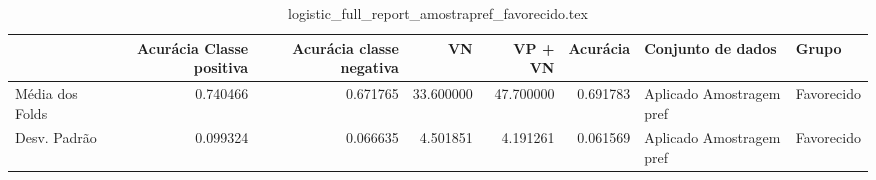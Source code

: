 \begin{table}
\centering
\caption{logistic_full_report_amostrapref_favorecido.tex}
\label{logistic_full_report_amostrapref_favorecido.tex}
\begin{tabular}{lrrrrrll}
\toprule
{} &  Acurácia Classe positiva &  Acurácia classe negativa &        VN  &   VP + VN  &  Acurácia &         Conjunto de dados &       Grupo \\
\midrule
Média dos Folds &                  0.740466 &                  0.671765 &  33.600000 &  47.700000 &  0.691783 &  Aplicado Amostragem pref &  Favorecido \\
Desv. Padrão    &                  0.099324 &                  0.066635 &   4.501851 &   4.191261 &  0.061569 &  Aplicado Amostragem pref &  Favorecido \\
\bottomrule
\end{tabular}
\end{table}

